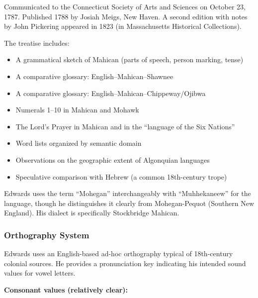 Communicated to the Connecticut Society of Arts and Sciences on October 23,
1787. Published 1788 by Josiah Meigs, New Haven. A second edition with notes
by John Pickering appeared in 1823 (in Massachusetts Historical Collections).

The treatise includes:

\begin{itemize}
  \item A grammatical sketch of Mahican (parts of speech, person marking,
    tense)
  \item A comparative glossary: English--Mahican--Shawnee
  \item A comparative glossary: English--Mahican--Chippeway/Ojibwa
  \item Numerals 1--10 in Mahican and Mohawk
  \item The Lord's Prayer in Mahican and in the ``language of the Six
    Nations''
  \item Word lists organized by semantic domain
  \item Observations on the geographic extent of Algonquian languages
  \item Speculative comparison with Hebrew (a common 18th-century trope)
\end{itemize}

Edwards uses the term ``Mohegan'' interchangeably with ``Muhhekaneew'' for
the language, though he distinguishes it clearly from Mohegan-Pequot
(Southern New England). His dialect is specifically Stockbridge Mahican.

\subsubsection{Orthography System}

Edwards uses an English-based ad-hoc orthography typical of 18th-century
colonial sources. He provides a pronunciation key indicating his intended
sound values for vowel letters.

\textbf{Consonant values (relatively clear):}

